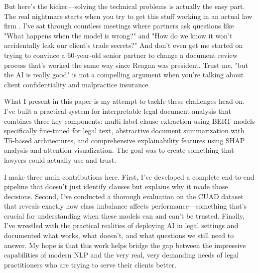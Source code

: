 But here's the kicker—solving the technical problems is actually the easy part. The real nightmare starts when you try to get this stuff working in an actual law firm \cite{paleyes2022challenges}. I've sat through countless meetings where partners ask questions like "What happens when the model is wrong?" and "How do we know it won't accidentally leak our client's trade secrets?" And don't even get me started on trying to convince a 60-year-old senior partner to change a document review process that's worked the same way since Reagan was president. Trust me, "but the AI is really good" is not a compelling argument when you're talking about client confidentiality and malpractice insurance.

What I present in this paper is my attempt to tackle these challenges head-on. I've built a practical system for interpretable legal document analysis that combines three key components: multi-label clause extraction using BERT models specifically fine-tuned for legal text, abstractive document summarization with T5-based architectures, and comprehensive explainability features using SHAP analysis and attention visualization. The goal was to create something that lawyers could actually use and trust.

I make three main contributions here. First, I've developed a complete end-to-end pipeline that doesn't just identify clauses but explains why it made those decisions. Second, I've conducted a thorough evaluation on the CUAD dataset that reveals exactly how class imbalance affects performance—something that's crucial for understanding when these models can and can't be trusted. Finally, I've wrestled with the practical realities of deploying AI in legal settings and documented what works, what doesn't, and what questions we still need to answer. My hope is that this work helps bridge the gap between the impressive capabilities of modern NLP and the very real, very demanding needs of legal practitioners who are trying to serve their clients better.

